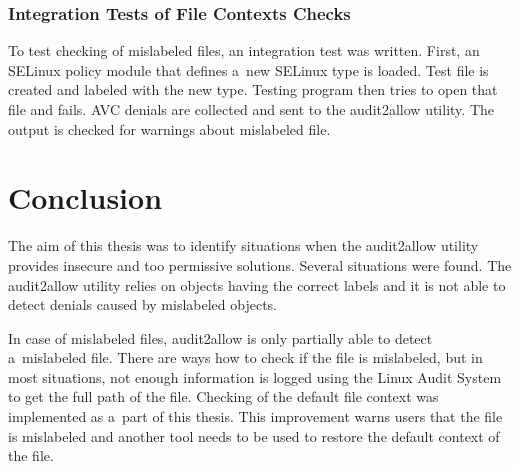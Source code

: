 \subsection{Integration Tests of File Contexts Checks}
To test checking of mislabeled files, an integration test was written. First,
an SELinux policy module that defines a~new SELinux type is loaded. Test file is
created and labeled with the new type. Testing program then tries to open that
file and fails. AVC denials are collected and sent to the audit2allow utility.
The output is checked for warnings about mislabeled file.

\chapter{Conclusion}


The aim of this thesis was to identify situations when the audit2allow utility
provides insecure and too permissive solutions. Several situations were found.
The audit2allow utility relies on objects having the correct labels and it is
not able to detect denials caused by mislabeled objects.

In case of mislabeled files, audit2allow is only partially able to detect
a~mislabeled file. There are ways how to check if the file is mislabeled, but in
most situations, not enough information is logged using the Linux Audit System
to get the full path of the file. Checking of the default file context was
implemented as a~part of this thesis. This improvement warns users that the file
is mislabeled and another tool needs to be used to restore the default context
of the file.

